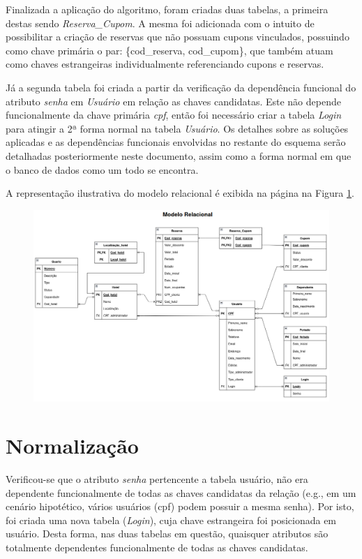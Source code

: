 \documentclass[a4paper, 12pt]{article}
\begin{document}
Finalizada a aplicação do algoritmo, foram criadas duas tabelas, a primeira destas sendo \emph{Reserva\_Cupom}. A mesma foi adicionada com o intuito de possibilitar a criação de reservas que não possuam cupons vinculados, possuindo como chave primária o par: \{cod\_reserva, cod\_cupom\}, que também atuam como chaves estrangeiras individualmente referenciando cupons e reservas. 

Já a segunda tabela foi criada a partir da verificação da dependência funcional do atributo \emph{senha} em \emph{Usuário} em relação as chaves candidatas. Este não depende funcionalmente da chave primária \emph{cpf}, então foi necessário criar a tabela \emph{Login} para atingir a 2ª forma normal na tabela \emph{Usuário}. Os detalhes sobre as soluções aplicadas e as dependências funcionais envolvidas no restante do esquema serão detalhadas posteriormente neste documento, assim como a forma normal em que o banco de dados como um todo se encontra. 

A representação ilustrativa do modelo relacional é exibida na página \pageref{fig:exampleFig2} na Figura \ref{fig:exampleFig2}.

\begin{figure}
    \centering
    \includegraphics[width=1.1\textwidth]{Images/Relacional.png}
    \label{fig:exampleFig2}
\end{figure}

\section{Normalização}

Verificou-se que o atributo \emph{senha} pertencente a tabela usuário, não era dependente funcionalmente de todas as chaves candidatas da relação (e.g., em um cenário hipotético, vários usuários (cpf) podem possuir a mesma senha). Por isto, foi criada uma nova tabela (\emph{Login}), cuja chave estrangeira foi posicionada em usuário. Desta forma, nas duas tabelas em questão, quaisquer atributos são totalmente dependentes funcionalmente de todas as chaves candidatas.
\end{document}
